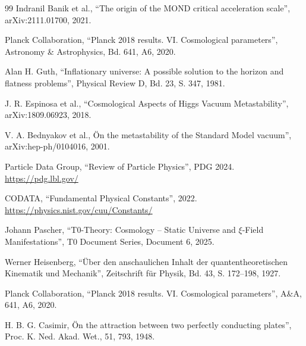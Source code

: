 \begin{thebibliography}{99}
		 Indranil Banik et al., ``The origin of the MOND critical acceleration scale'', arXiv:2111.01700, 2021.
		
		 Planck Collaboration, ``Planck 2018 results. VI. Cosmological parameters'', Astronomy \& Astrophysics, Bd. 641, A6, 2020.
		
		 Alan H. Guth, ``Inflationary universe: A possible solution to the horizon and flatness problems'', Physical Review D, Bd. 23, S. 347, 1981.
		
		 J. R. Espinosa et al., ``Cosmological Aspects of Higgs Vacuum Metastability'', arXiv:1809.06923, 2018.
		
		 V. A. Bednyakov et al., Ön the metastability of the Standard Model vacuum'', arXiv:hep-ph/0104016, 2001.
		
		 Particle Data Group, ``Review of Particle Physics'', PDG 2024. \url{https://pdg.lbl.gov/}
		
		 CODATA, ``Fundamental Physical Constants'', 2022. \url{https://physics.nist.gov/cuu/Constants/}
		
		 Johann Pascher, ``T0-Theory: Cosmology – Static Universe and $\xi$-Field Manifestations'', T0 Document Series, Document 6, 2025. 
		
		 Werner Heisenberg, ``Über den anschaulichen Inhalt der quantentheoretischen Kinematik und Mechanik'', Zeitschrift für Physik, Bd. 43, S. 172–198, 1927.
		
		 Planck Collaboration, ``Planck 2018 results. VI. Cosmological parameters'', A\&A, 641, A6, 2020.
		
		 H. B. G. Casimir, Ön the attraction between two perfectly conducting plates'', Proc. K. Ned. Akad. Wet., 51, 793, 1948.
		
	\end{thebibliography}